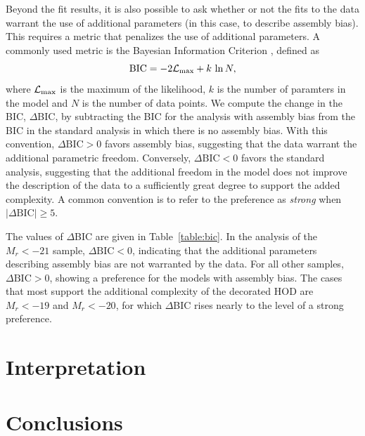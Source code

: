 \documentclass[usenatbib,usegraphicx,letterpaper]{mn2e}
\newcommand{\magr}{M_r}
\begin{document}
Beyond the fit results, it is also possible to ask whether or not the fits to the data warrant the use of 
additional parameters (in this case, to describe assembly bias). This requires a metric that penalizes the 
use of additional parameters. A commonly used metric is the Bayesian Information Criterion 
\citep[BIC,][]{schwarz78}, defined as 
%
\begin{equation}
\mathrm{BIC} = -2 \mathcal{L}_{\rm max} + k\, \ln N, 
\end{equation}
%
where $\mathcal{L}_{\rm max}$ is the maximum of the likelihood, 
$k$ is the number of paramters in the model and $N$ is the number of 
data points. We compute the change in the BIC, $\Delta$BIC, by subtracting 
the BIC for the analysis with assembly bias from the BIC in the standard analysis 
in which there is no assembly bias. With this convention, $\Delta \mathrm{BIC} > 0$ 
favors assembly bias, suggesting that the data warrant the additional parametric freedom. 
Conversely, $\Delta \mathrm{BIC} < 0$ favors the standard analysis, 
suggesting that the additional freedom in the model does not improve the description of the data 
to a sufficiently great degree to support the added complexity. 
A common convention is to refer to the preference as 
{\em strong} when $\vert \Delta \mathrm{BIC}\vert \ge 5$. 

The values of $\Delta$BIC are given in Table~\ref{table:bic}. In the analysis of the $\magr < -21$ sample, 
$\Delta \mathrm{BIC} < 0$, indicating that the additional parameters describing assembly bias are not 
warranted by the data. For all other samples, $\Delta \mathrm{BIC} > 0$, showing a preference for 
the models with assembly bias. The cases that most support the additional complexity 
of the decorated HOD are $\magr < -19$ and $\magr < -20$, for which $\Delta$BIC 
rises nearly to the level of a {\rm strong} preference. 

\section{Interpretation}
\label{section:discussion}



\section{Conclusions}
\label{section:conclusions}
\end{document}
